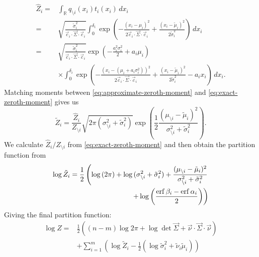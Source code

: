 \documentclass[11pt,twoside]{report}
\begin{document}
\begin{align}
  \hat{Z}_i
  =&
  \int_{\mathbb{R}} q_{\setminus i}(x_i) t_i(x_i) \, dx_i
  \nonumber \\ =&
  \sqrt{ \frac{\tilde{\sigma}_i^2}{\vec{c}_i \cdot \vec{\Sigma} \cdot \vec{c}_i} }
  \int_0^{\delta_i}
  \exp{\left( -\frac{(x_i - \mu_i)^2}{2 \vec{c}_i \cdot \vec{\Sigma} \cdot \vec{c}_i} +
    \frac{(x_i - \tilde{\mu}_i)^2}{2 \tilde{\sigma}_i^2} \right)} \, dx_i
  \nonumber \\ =&
  \sqrt{ \frac{\tilde{\sigma}_i^2}{\vec{c}_i \cdot \vec{\Sigma} \cdot \vec{c}_i} }
  \exp{\left(
    - \frac{a_i^2 \sigma_i^2}{2}
    + a_i \mu_i
    \right)}
  \nonumber \\ &
  \times \int_0^{\delta_i}
  \exp{\left( -\frac{(x_i - (\mu_i + a_i \sigma_i^2))^2}{2 \vec{c}_i \cdot \vec{\Sigma} \cdot \vec{c}_i} +
    \frac{(x_i - \tilde{\mu}_i)^2}{2 \tilde{\sigma}_i^2} - a_i x_i \right)} \, dx_i.
\end{align}
Matching moments between \eqref{eq:approximate-zeroth-moment} and \eqref{eq:exact-zeroth-moment} gives us
\begin{equation}
  \tilde{Z}_i = \frac{\hat{Z}_i}{Z_{\setminus i}}
  \sqrt{2 \pi (\sigma_{\setminus i}^2 + \tilde{\sigma}_i^2)}
  \exp{\left(
    \frac{1}{2}
    \frac{(\mu_{\setminus i} - \tilde{\mu}_i)^2}{\sigma_{\setminus i}^2 + \tilde{\sigma}_i^2}
    \right)}.
\end{equation}
We calculate $\hat{Z}_i / Z_{\setminus i}$ from \eqref{eq:exact-zeroth-moment} and then obtain the partition function from
\begin{equation}
  \begin{split}
    \log{\tilde{Z}_i}
    =
    \frac{1}{2} \left(
    \log{(2\pi)} +
    \log{(\sigma_{\setminus i}^2 + \tilde{\sigma}_i^2)} +
    \frac{(\mu_{\setminus i} - \tilde{\mu}_i)^2}{\sigma_{\setminus i}^2 + \tilde{\sigma}_i^2}
    \right.&
    \\
    \left.
    + \log{\left(\frac{\operatorname{erf}{\beta_i} - \operatorname{erf}{\alpha_i}}{2}\right)}
    \right)&
  \end{split}
\end{equation}
Giving the final partition function:
\begin{equation}
  \begin{split}
    \log{Z}
    =&
    \frac{1}{2} \left(
    (n-m) \log{2\pi}
    + \log\det{\vec{\Sigma}}
    + \vec{\nu} \cdot \vec{\Sigma} \cdot \vec{\nu}
    \right)
    \\ &
    + \sum_{i=1}^m \left(
    \log{\tilde{Z}_i}
    - \frac{1}{2}
    \left(
    \log{\tilde{\sigma}_i^2}
    + \tilde{\nu}_i \tilde{\mu}_i
    \right)
    \right)
  \end{split}
\end{equation}
\end{document}
